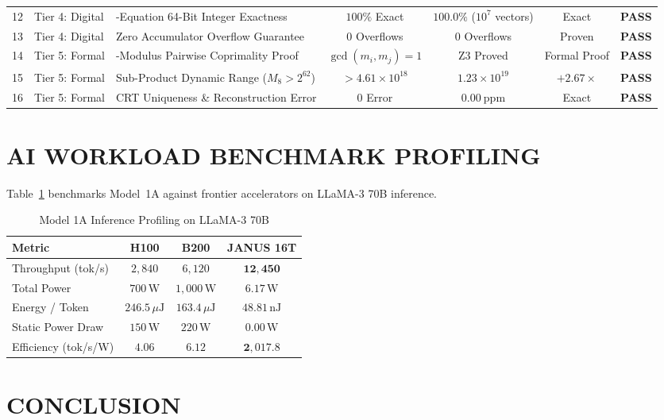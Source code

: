 \documentclass[journal]{IEEEtran}
\begin{document}
\begin{table}[!htbp]
\begin{tabularx}{\textwidth}{c l >{\raggedright\arraybackslash}X c c c c}
\midrule
12 & Tier 4: Digital & 3-Equation 64-Bit Integer Exactness & $100\%$ Exact & $100.0\%$ ($10^7$ vectors) & Exact & \textbf{PASS} \\
13 & Tier 4: Digital & Zero Accumulator Overflow Guarantee & $0$ Overflows & $0$ Overflows & Proven & \textbf{PASS} \\
\midrule
14 & Tier 5: Formal & 8-Modulus Pairwise Coprimality Proof & $\gcd(m_i,m_j)=1$ & Z3 Proved & Formal Proof & \textbf{PASS} \\
15 & Tier 5: Formal & Sub-Product Dynamic Range ($M_8 > 2^{62}$) & $> 4.61\times 10^{18}$ & $1.23\times 10^{19}$ & $+2.67\times$ & \textbf{PASS} \\
16 & Tier 5: Formal & CRT Uniqueness \& Reconstruction Error & $0$ Error & $0.00~\mathrm{ppm}$ & Exact & \textbf{PASS} \\
\bottomrule
\end{tabularx}
\end{table}

\section{AI WORKLOAD BENCHMARK PROFILING}

Table~\ref{tab:ai_benchmarks} benchmarks Model~1A against frontier accelerators on LLaMA-3 70B inference.

\begin{table}[!htbp]
\centering
\footnotesize
\caption{Model 1A Inference Profiling on LLaMA-3 70B}
\label{tab:ai_benchmarks}
\begin{tabularx}{\columnwidth}{>{\raggedright\arraybackslash}X c c c}
\toprule
\textbf{Metric} & \textbf{H100} & \textbf{B200} & \textbf{JANUS 16T} \\
\midrule
Throughput (tok/s) & $2,840$ & $6,120$ & $\mathbf{12,450}$ \\
Total Power & $700\,\mathrm{W}$ & $1,000\,\mathrm{W}$ & $\mathbf{6.17\,\mathrm{W}}$ \\
Energy / Token & $246.5\,\mu\mathrm{J}$ & $163.4\,\mu\mathrm{J}$ & $\mathbf{48.81\,\mathrm{nJ}}$ \\
Static Power Draw & $150\,\mathrm{W}$ & $220\,\mathrm{W}$ & $\mathbf{0.00\,\mathrm{W}}$ \\
Efficiency (tok/s/W) & $4.06$ & $6.12$ & $\mathbf{2,017.8}$ \\
\bottomrule
\end{tabularx}
\end{table}

\section{CONCLUSION}
\end{document}
